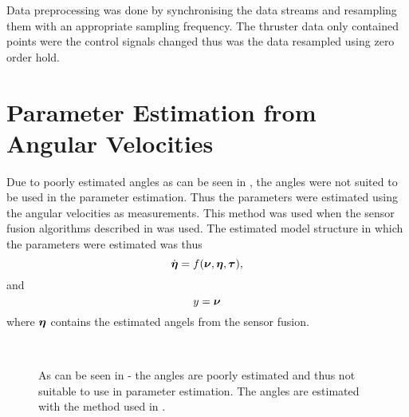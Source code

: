Data preprocessing was done by synchronising the data streams and resampling them with an appropriate sampling frequency. The thruster data only contained points were the control signals changed thus was the data resampled using zero order hold.  

\section{Parameter Estimation from Angular Velocities} \label{sec:estimation_angular}
Due to poorly estimated angles as can be seen in , the angles were not suited to be used in the parameter estimation. Thus the parameters were estimated using the angular velocities as measurements. This method was used when the sensor fusion algorithms described in  was used. The estimated model structure in which the parameters were estimated was thus 
\begin{equation}
\dot{\boldsymbol{\eta}} = f(\boldsymbol{\nu}, \boldsymbol{\eta}, \boldsymbol{\tau}),
\end{equation}
and
\begin{equation}
y = \boldsymbol{\nu}
\end{equation}
where $\boldsymbol{\eta}$ contains the estimated angels from the sensor fusion.

\begin{figure}[tbp]
  \centering
  \qquad
  \\
  \caption{\label{fig:integratedAngleVelocities}%
    As can be seen in \protect{}-\protect{} the angles are poorly estimated and thus not suitable to use in parameter estimation. The angles are estimated with the method used in .}
\end{figure}

